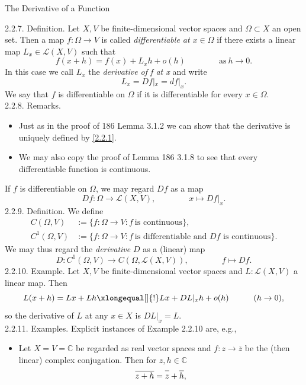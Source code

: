 \documentclass[smaller,hyperref={CJKbookmarks=true}]{beamer}
\newcommand{\C}{\mathbb{C}} \newcommand{\F}{\mathbb{F}} \newcommand{\R}{\mathbb{R}} \newcommand{\Q}{\mathbb{Q}}
\begin{document}
\begin{frame}{The Derivative of a Function}
\begin{spacing}{0.95}
\alert{2.2.7. Definition.} Let $X,V$ be finite-dimensional vector spaces and $\Omega\subset X$ an open set. Then a map $f:\Omega\to V$ is called \emph{dif{}ferentiable at $x\in\Omega$} if there exists a linear map $L_x\in\mathcal{L}(X,V)$ such that
\setcounter{equation}{0}
\begin{equation}\label{2.2.1}
  f(x+h)=f(x)+L_xh+o(h)\qquad\qquad\text{as}~h\to 0.
\end{equation}
In this case we call $L_x$ the \emph{derivative of f at x} and write
\[L_x=Df|_x=df|_x.\]
We say that $f$ is dif{}ferentiable on $\Omega$ if it is dif{}ferentiable for every $x\in\Omega$.\\[5pt]
\alert{2.2.8. Remarks.}
\begin{itemize}
  \item Just as in the proof of 186 Lemma 3.1.2 we can show that the
derivative is uniquely defined by \eqref{2.2.1}.
  \item We may also copy the proof of Lemma 186 3.1.8 to see that every
dif{}ferentiable function is continuous.
\end{itemize}
\newpage
If $f$ is dif{}ferentiable on $\Omega$, we may regard $Df$ as a map
\[Df:\Omega\to\mathcal{L}(X,V),\qquad\qquad x\mapsto Df|_x.\]
\alert{2.2.9. Definition.} We define
\begin{align*}
  C(\Omega,V) &:=\{f:\Omega\to V:f~\text{is continuous}\}, \\
  C^1(\Omega,V) &:=\{f:\Omega\to V:f~\text{is dif{}ferentiable and $Df$ is continuous}\}.
\end{align*}
We may thus regard the \emph{derivative} $D$ as a (linear) map
\[D:C^1(\Omega,V)\to C(\Omega,\mathcal{L}(X,V)),\qquad\qquad f\mapsto Df.\]
\newpage
\alert{2.2.10. Example.} Let $X,V$ be finite-dimensional vector spaces and $L:\mathcal{L}(X,V)$ a linear map. Then
\[L(x+h)=Lx+Lh\xlongequal[]{!}Lx+DL|_xh+o(h)\qquad\quad(h\to0),\]
so the derivative of $L$ at any $x\in X$ is $DL|_x=L$.\\[12pt]
\alert{2.2.11. Examples.} Explicit instances of Example 2.2.10 are, e.g.,
\begin{itemize}
  \item Let $X=V=\C$ be regarded as real vector spaces and $f:z\to\overline{z}$ be the (then linear) complex conjugation. Then for $z,h\in\C$
      \[\overline{z+h}=\overline{z\mathstrut}+\overline{h\mathstrut},\]

\end{itemize}
\end{spacing}
\end{frame}
\end{document}

